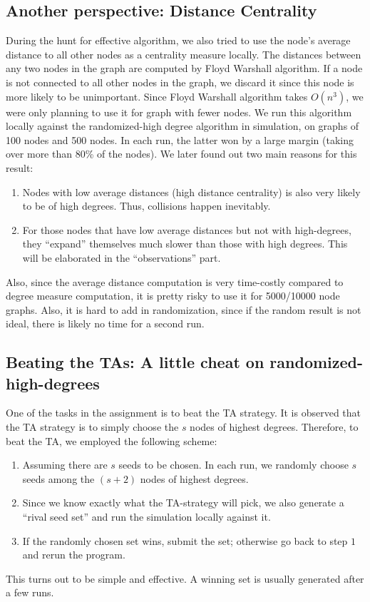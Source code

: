 \documentclass[12pt]{article}
\begin{document}
\subsection{Another perspective: Distance Centrality}
During the hunt for effective algorithm, we also tried to use the node's average distance to all other nodes as a centrality measure locally. The distances between any two nodes in the graph are computed by Floyd Warshall algorithm. If a node is not connected to all other nodes in the graph, we discard it since this node is more likely to be unimportant.
Since Floyd Warshall algorithm takes $O(n^3)$, we were only planning to use it for graph with fewer nodes. We run this algorithm locally against the randomized-high degree algorithm in simulation, on graphs of 100 nodes and 500 nodes. In each run, the latter won by a large margin (taking over more than 80\% of the nodes). We later found out two main reasons for this result:
\begin{enumerate}
\item Nodes with low average distances (high distance centrality) is also very likely to be of high degrees. Thus, collisions happen inevitably. 
\item For those nodes that have low average distances but not with high-degrees, they ``expand'' themselves much slower than those with high degrees. This will be elaborated in the ``observations'' part. 
\end{enumerate}
Also, since the average distance computation is very time-costly compared to degree measure computation, it is pretty risky to use it for 5000/10000 node graphs. Also, it is hard to add in randomization, since if the random result is not ideal, there is likely no time for a second run. 

\subsection{Beating the TAs: A little cheat on randomized-high-degrees}
One of the tasks in the assignment is to beat the TA strategy. It is observed that the TA strategy is to simply choose the $s$ nodes of highest degrees. Therefore, to beat the TA, we employed the following scheme:
\begin{enumerate}
\item Assuming there are $s$ seeds to be chosen. In each run, we randomly choose $s$ seeds among the $(s+2)$ nodes of highest degrees. 
\item Since we know exactly what the TA-strategy will pick, we also generate a ``rival seed set'' and run the simulation locally against it. 
\item If the randomly chosen set wins, submit the set; otherwise go back to step $1$ and rerun the program. 
\end{enumerate}
This turns out to be simple and effective. A winning set is usually generated after a few runs. 
\end{document}
